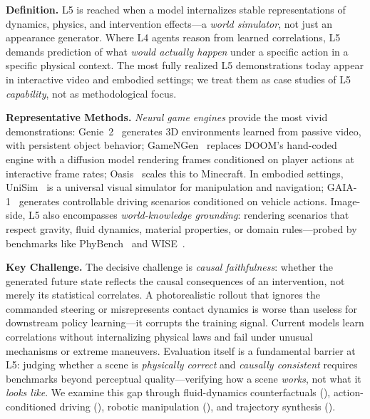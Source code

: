\documentclass{llmxive}
\begin{document}
\textbf{Definition.} L5 is reached when a model internalizes stable representations of dynamics, physics, and intervention effects---a \emph{world simulator}, not just an appearance generator. Where L4 agents reason from learned correlations, L5 demands prediction of what \emph{would actually happen} under a specific action in a specific physical context. The most fully realized L5 demonstrations today appear in interactive video and embodied settings; we treat them as case studies of L5 \emph{capability}, not as methodological focus.

\textbf{Representative Methods.} \emph{Neural game engines} provide the most vivid demonstrations: Genie~2~\citep{parker2024genie2} generates 3D environments learned from passive video, with persistent object behavior; GameNGen~\citep{valevski2024gamenngen} replaces DOOM's hand-coded engine with a diffusion model rendering frames conditioned on player actions at interactive frame rates; Oasis~\citep{oasis2024} scales this to Minecraft. In embodied settings, UniSim~\citep{yang2024unisim} is a universal visual simulator for manipulation and navigation; GAIA-1~\citep{hu2024gaia1} generates controllable driving scenarios conditioned on vehicle actions. Image-side, L5 also encompasses \emph{world-knowledge grounding}: rendering scenarios that respect gravity, fluid dynamics, material properties, or domain rules---probed by benchmarks like PhyBench~\citep{meng2024phybench} and WISE~\citep{niu2025wise}.

\textbf{Key Challenge.} The decisive challenge is \emph{causal faithfulness}: whether the generated future state reflects the causal consequences of an intervention, not merely its statistical correlates. A photorealistic rollout that ignores the commanded steering or misrepresents contact dynamics is worse than useless for downstream policy learning---it corrupts the training signal. Current models learn correlations without internalizing physical laws and fail under unusual mechanisms or extreme maneuvers. Evaluation itself is a fundamental barrier at L5: judging whether a scene is \emph{physically correct} and \emph{causally consistent} requires benchmarks beyond perceptual quality---verifying how a scene \emph{works}, not what it \emph{looks like}. We examine this gap through fluid-dynamics counterfactuals (), action-conditioned driving (), robotic manipulation (), and trajectory synthesis ().
\end{document}
